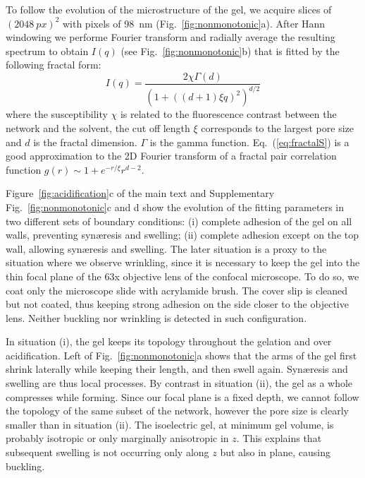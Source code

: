 \documentclass[twocolumn,superscriptaddress,showpacs,preprintnumbers,
amsmath,amssymb,prl]{revtex4-1}
\begin{document}
To follow the evolution of the microstructure of the gel, we acquire slices of $(\SI{2048}{px})^2$ with pixels of \SI{98}{\nano\metre} (Fig.~\ref{fig:nonmonotonic}a). After Hann windowing we performe Fourier transform and radially average the resulting spectrum to obtain $I(q)$ (see Fig.~\ref{fig:nonmonotonic}b) that is fitted by the following fractal form:
\begin{equation}
I(q) = \frac{2\chi\Gamma(d)}{\left(1+\left((d+1)\xi q\right)^2\right)^{d/2}}
\label{eq:fractalS}
\end{equation}
where the susceptibility $\chi$ is related to the fluorescence contrast between the network and the solvent, the cut off length $\xi$ corresponds to the largest pore size and $d$ is the fractal dimension. $\Gamma$ is the gamma function. Eq.~(\ref{eq:fractalS}) is a good approximation to the 2D Fourier transform of a fractal pair correlation function $g(r) \sim 1+ e^{-r/\xi} r^{d-2}$.

Figure~\ref{fig:acidification}c of the main text and Supplementary Fig.~\ref{fig:nonmonotonic}c and d show the evolution of the fitting parameters in two different sets of boundary conditions: (i) complete adhesion of the gel on all walls, preventing syn\ae{}resis and swelling; (ii) complete adhesion except on the top wall, allowing syn\ae{}resis and swelling. The later situation is a proxy to the situation where we observe wrinkling, since it is necessary to keep the gel into the thin focal plane of the 63x objective lens of the confocal microscope. To do so, we coat only the microscope slide with acrylamide brush. The cover slip is cleaned but not coated, thus keeping strong adhesion on the side closer to the objective lens. Neither buckling nor wrinkling is detected in such configuration.

In situation (i), the gel keeps its topology throughout the gelation and over acidification. Left of Fig.~\ref{fig:nonmonotonic}a shows that the arms of the gel first shrink laterally while keeping their length, and then swell again. Syn\ae{}resis and swelling are thus local processes. By contrast in situation (ii), the gel as a whole compresses while forming. Since our focal plane is a fixed depth, we cannot follow the topology of the same subset of the network, however the pore size is clearly smaller than in situation (ii). The isoelectric gel, at minimum gel volume, is probably isotropic or only marginally anisotropic in $z$. This explains that subsequent swelling is not occurring only along $z$ but also in plane, causing buckling.
\end{document}
